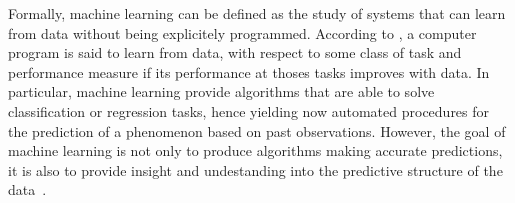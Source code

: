 Formally, machine learning can be defined as the study of systems that can
learn from data without being explicitely programmed. According to
\citet{mitchell:1997}, a computer program is said to learn from data, with
respect to some class of task and performance measure if its performance at
thoses tasks improves with data. In particular, machine learning provide
algorithms that are able to solve classification or regression tasks, hence
yielding now automated procedures for the prediction of a phenomenon based on
past observations. However, the goal of machine learning is not only to produce
algorithms making accurate predictions, it is also to provide insight and
undestanding into the predictive structure of the data~\citep{breiman:1984}.






